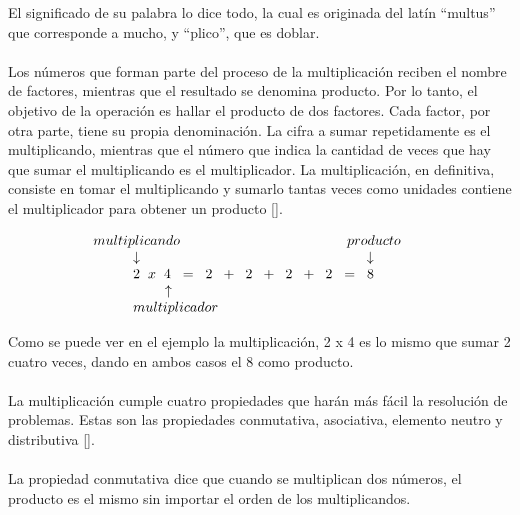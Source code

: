 \documentclass[10pt,journal,compsoc]{IEEEtran}
\begin{document}
El significado de su palabra lo dice todo, la cual es originada del latín “multus” que corresponde a mucho, y “plico”, que es doblar.
\\\\
Los números que forman parte del proceso de la multiplicación reciben el nombre de factores, mientras que el resultado se denomina producto. Por lo tanto, el objetivo de la operación es hallar el producto de dos factores.
Cada factor, por otra parte, tiene su propia denominación. La cifra a sumar repetidamente es el multiplicando, mientras que el número que indica la cantidad de veces que hay que sumar el multiplicando es el multiplicador. La multiplicación, en definitiva, consiste en tomar el multiplicando y sumarlo tantas veces como unidades contiene el multiplicador para obtener un producto [\cite{KPR86}].

\begin{center}
\[
\begin{array}{rl l}
&  \hspace{-1cm} multiplicando \hspace{4.2cm} producto \\
& \downarrow \hspace{5.7cm} \downarrow \\
& 2 \hspace{0.2cm} x \hspace{0.2cm} 4 \hspace{0.2cm} = \hspace{0.2cm} 2 \hspace{0.2cm} + \hspace{0.2cm} 2 \hspace{0.2cm} + \hspace{0.2cm} 2 \hspace{0.2cm} + \hspace{0.2cm} 2 \hspace{0.2cm} = \hspace{0.2cm} 8 \\
& \hspace{0.8cm} \uparrow \\
& multiplicador \\
\end{array}
\]
\end{center}

Como se puede ver en el ejemplo la multiplicación, 2 x 4 es lo mismo que sumar 2 cuatro veces, dando en ambos casos el 8 como producto.
\\\\
La multiplicación cumple cuatro propiedades que harán más fácil la resolución de problemas. Estas son las propiedades conmutativa, asociativa, elemento neutro y distributiva [\cite{AS00}].
\\\\
La propiedad conmutativa dice que cuando se multiplican dos números, el producto es el mismo sin importar el orden de los multiplicandos.
\end{document}
